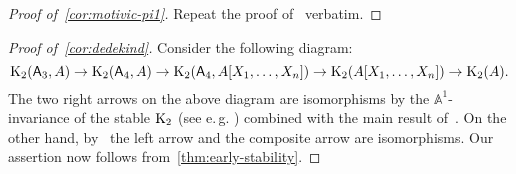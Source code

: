 \begin{proof}[Proof of~\cref{cor:motivic-pi1}]
    Repeat the proof of~\cite[Corollary~1.2]{LSV2} verbatim.
\end{proof}

\begin{proof}[Proof of~\cref{cor:dedekind}]
    Consider the following diagram:
    \[ \operatorname{K}_2(\mathsf{A}_3, A) \to \operatorname{K}_2(\mathsf{A}_4, A) \to \operatorname{K}_2(\mathsf{A}_4, A[X_1, \ldots, X_n]) \rightarrow \operatorname{K}_2(A[X_1, \ldots, X_n]) \to \operatorname{K}_2(A).\]
    The two right arrows on the above diagram are isomorphisms by the $\mathbb{A}^1$-invariance of the stable $\operatorname{K}_2$
    (see e.\,g. \cite[Theorem~V.6.3]{Kbook}) combined with the main result of~\cite{Tu83}.
    On the other hand, by~\cite[Corollary~3.2]{ST76} the left arrow and the composite arrow are isomorphisms.
    Our assertion now follows from~\cref{thm:early-stability}.
\end{proof}
